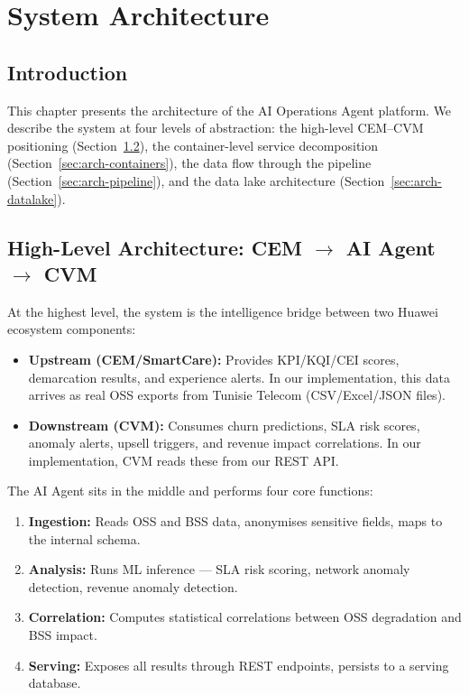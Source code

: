 \chapter{System Architecture}
\label{ch:architecture}

\section{Introduction}

This chapter presents the architecture of the AI Operations Agent platform. We describe the system at four levels of abstraction: the high-level CEM--CVM positioning (Section~\ref{sec:arch-highlevel}), the container-level service decomposition (Section~\ref{sec:arch-containers}), the data flow through the pipeline (Section~\ref{sec:arch-pipeline}), and the data lake architecture (Section~\ref{sec:arch-datalake}).

\section{High-Level Architecture: CEM $\to$ AI Agent $\to$ CVM}
\label{sec:arch-highlevel}

At the highest level, the system is the intelligence bridge between two Huawei ecosystem components:

\begin{itemize}
  \item \textbf{Upstream (CEM/SmartCare):} Provides KPI/KQI/CEI scores, demarcation results, and experience alerts. In our implementation, this data arrives as real OSS exports from Tunisie Telecom (CSV/Excel/JSON files).
  \item \textbf{Downstream (CVM):} Consumes churn predictions, SLA risk scores, anomaly alerts, upsell triggers, and revenue impact correlations. In our implementation, CVM reads these from our REST API.
\end{itemize}

The AI Agent sits in the middle and performs four core functions:
\begin{enumerate}
  \item \textbf{Ingestion:} Reads OSS and BSS data, anonymises sensitive fields, maps to the internal schema.
  \item \textbf{Analysis:} Runs ML inference --- SLA risk scoring, network anomaly detection, revenue anomaly detection.
  \item \textbf{Correlation:} Computes statistical correlations between OSS degradation and BSS impact.
  \item \textbf{Serving:} Exposes all results through REST endpoints, persists to a serving database.
\end{enumerate}

